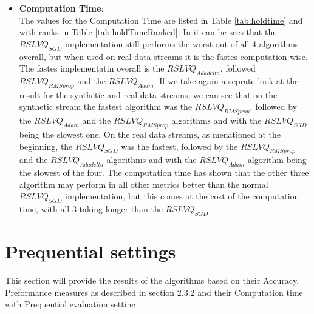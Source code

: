 \documentclass[12pt,oneside,a4paper,parskip]{scrbook}
\begin{document}
\begin{itemize}
  \item \textbf{Computation Time}: \\
        The values for the Computation Time are listed in Table \ref{tab:holdtime} and with ranks in Table \ref{tab:holdTimeRanked}.
        In it can be sees that the $RSLVQ_\textit{SGD}$ implementation still performs the worst out of all 4 algorithms overall,
        but when used on real data streams it is the fastes computation wise.
        The fastes implementatin overall is the $RSLVQ_\textit{Adadelta}$, followed $RSLVQ_\textit{RMSprop}$ and the $RSLVQ_\textit{Adam}$.
        If we take again a seprate look at the result for the synthetic and real data streams, we can see that on the synthetic stream the 
        fastest algorithm was the $RSLVQ_\textit{RMSprop}$, followed by the $RSLVQ_\textit{Adam}$ and the $RSLVQ_\textit{RMSprop}$ 
        algorithms and with the $RSLVQ_\textit{SGD}$ being the slowest one.
        On the real data streams, as menationed at the beginning, the $RSLVQ_\textit{SGD}$ was the fastest, followed by the $RSLVQ_\textit{RMSprop}$ and
        the $RSLVQ_\textit{Adadelta}$ algorithms and with the $RSLVQ_\textit{Adam}$ algorithm being the slowest of the four.
        The computation time has shown that the other three algorithm may perform in all other metrics better than the normal 
        $RSLVQ_\textit{SGD}$ implementation, but this comes at the cost of the computation time, with all 3 taking longer than the
        $RSLVQ_\textit{SGD}$.

\end{itemize}
\section{Prequential settings}
This section will provide the results of the algorithms based on their Accuracy, Preformance measures as described in section 2.3.2
and their Computation time with Prequential evaluation setting.
\end{document}

